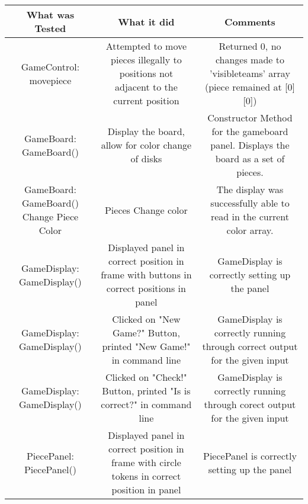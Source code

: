 \documentclass[12pt]{article}
\begin{document}
	\begin{tabularx}{\linewidth}{|C|C|C|}
		\hline
		What was Tested & What it did & Comments \\
		\hline 
		 GameControl: movepiece & Attempted to move pieces illegally to positions not adjacent to the current position & Returned 0, no changes made to 'visibleteams' array (piece remained at [0][0]) \\    
		 \hline 
		GameBoard: GameBoard() & Display the board, allow for color change of disks & Constructor Method for the gameboard panel. Displays the board as a set of pieces. \\
		\hline
		GameBoard: GameBoard() Change Piece Color& Pieces Change color & The display was successfully able to read in the current color array. \\
		\hline
	
		GameDisplay: GameDisplay() & Displayed panel in correct position in frame with buttons in correct positions in panel & GameDisplay is correctly setting up the panel \\
		\hline
		GameDisplay: GameDisplay()& Clicked on "New Game?" Button,  printed "New Game!" in command line & GameDisplay is correctly running through correct output for the given input \\
		\hline
		GameDisplay: GameDisplay() & Clicked on "Check!" Button, printed "Is is correct?" in command line & GameDisplay is correctly running through corect output for the given input \\
		\hline
		PiecePanel: PiecePanel() & Displayed panel in correct position in frame with circle tokens in correct position in panel & PiecePanel is correctly setting up the panel \\
		\hline
	\end{tabularx}
	\newpage
\end{document}
